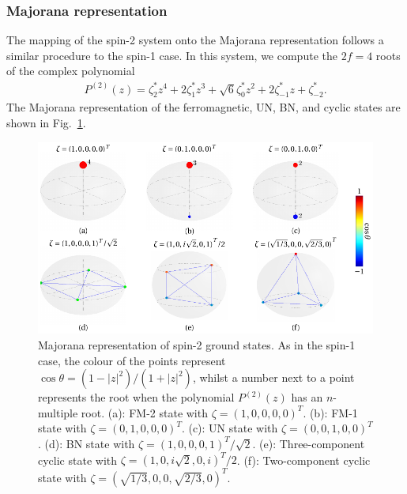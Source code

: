 \subsubsection{Majorana representation}
The mapping of the spin-2 system onto the Majorana representation follows a
similar procedure to the spin-1 case.
In this system, we compute the \(2f=4\) roots of the complex polynomial
\begin{align}
    P^{(2)}(z) = \zeta_2^*z^4 + 2\zeta_1^*z^3 + \sqrt{6}\zeta_0^*z^2
    + 2\zeta_{-1}^*z + \zeta_{-2}^*.
\end{align}
The Majorana representation of the ferromagnetic, UN, BN, and cyclic states
are shown in Fig.~\ref{fig: spin-2-Majorana}.
\begin{figure}
    \centering
    \includegraphics{gfx/ch-groundStateSymmetries/spin-2-majorana.pdf}
    \caption[Majorana representation of spin-2 ground states]
    {\label{fig: spin-2-Majorana}Majorana representation of spin-2 ground
    states.
    As in the spin-1 case, the colour of the points represent \(\cos\theta =
    (1-|z|^2)/(1+|z|^2)\), whilst a number next to a point represents the root
    when the polynomial \(P^{(2)}(z)\) has an \(n\)-multiple root.
    (a): FM-2 state with \(\zeta={(1, 0, 0, 0, 0)}^T\).
    (b): FM-1 state with \(\zeta={(0, 1, 0, 0, 0)}^T\).
    (c): UN state with \(\zeta={(0, 0, 1, 0, 0)}^T\).
    (d): BN state with \(\zeta={(1, 0, 0, 0, 1)}^T/\sqrt{2}\).
    (e): Three-component cyclic state with
    \(\zeta={(1, 0, i\sqrt{2}, 0, i)}^T/2\).
    (f): Two-component cyclic state with
    \(\zeta={(\sqrt{1/3}, 0, 0, \sqrt{2/3}, 0)}^T\).}
\end{figure}


